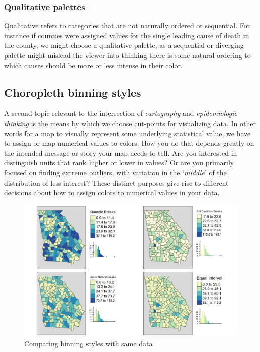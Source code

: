 \documentclass[
]{book}
\begin{document}
\hypertarget{qualitative-palettes}{%
\subsubsection{Qualitative palettes}\label{qualitative-palettes}}

Qualitative refers to categories that are not naturally ordered or sequential. For instance if counties were assigned values for the single leading cause of death in the county, we might choose a qualitative palette, as a sequential or diverging palette might mislead the viewer into thinking there is some natural ordering to which causes should be more or less intense in their color.

\hypertarget{choropleth-binning-styles}{%
\subsection{Choropleth binning styles}\label{choropleth-binning-styles}}

A second topic relevant to the intersection of \emph{cartography} and \emph{epidemiologic thinking} is the means by which we choose cut-points for visualizing data. In other words for a map to visually represent some underlying statistical value, we have to assign or map numerical values to colors. How you do that depends greatly on the intended message or story your map needs to tell. Are you interested in distinguish units that rank higher or lower in values? Or are you primarily focused on finding extreme outliers, with variation in the `\emph{middle}' of the distribution of less interest? These distinct purposes give rise to different decisions about how to assign colors to numerical values in your data.

\begin{figure}
\includegraphics[width=0.75\linewidth]{images/cutpoints-vlbw} \caption{Comparing binning styles with same data}\label{fig:unnamed-chunk-6}
\end{figure}
\end{document}
